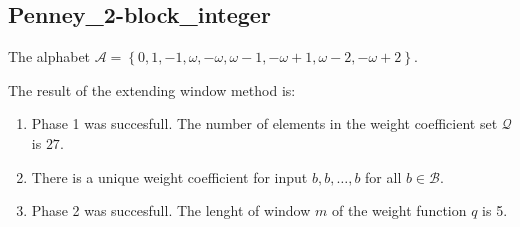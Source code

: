 \subsection{ Penney\_2-block\_integer }

\label{subsec:Penney2-blockinteger}

The alphabet $\mathcal{A} =\left\{0, 1, -1, \omega, -\omega, \omega - 1, -\omega + 1, \omega - 2, -\omega + 2\right\}$.

\noindent The result of the extending window method is:
\begin{enumerate}
    \item Phase 1 was succesfull.
The number of elements in the weight coefficient set $\mathcal{Q}$ is $27$.

    \item There is a unique weight coefficient for input $b,b,\dots,b$ for all $b\in\mathcal{B}$.

    \item Phase 2 was succesfull.
The lenght of window $m$ of the weight function $q$ is 5.
\end{enumerate}
